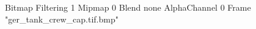 {Bitmap
	{Filtering 1}
	{Mipmap 0}
	{Blend none}
	{AlphaChannel 0}
	{Frame "ger_tank_crew_cap.tif.bmp"}
}
